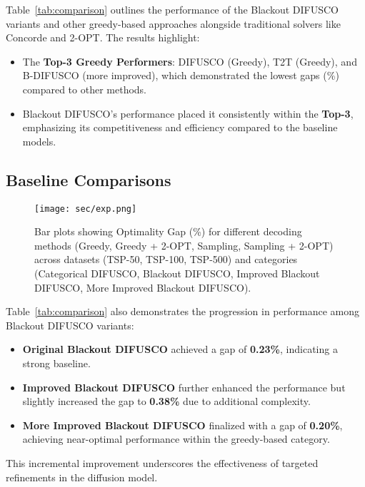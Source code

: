 Table~\ref{tab:comparison} outlines the performance of the Blackout DIFUSCO variants and other greedy-based approaches alongside traditional solvers like Concorde and 2-OPT. The results highlight:
\begin{itemize}
    \item The \textbf{Top-3 Greedy Performers}: DIFUSCO (Greedy), T2T (Greedy), and B-DIFUSCO (more improved), which demonstrated the lowest gaps (\%) compared to other methods.
    \item Blackout DIFUSCO's performance placed it consistently within the \textbf{Top-3}, emphasizing its competitiveness and efficiency compared to the baseline models.
\end{itemize}

\subsection{Baseline Comparisons}

\begin{figure}[ht]
    \centering
    \texttt{[image: sec/exp.png]}
    \caption{Bar plots showing Optimality Gap (\%) for different decoding methods (Greedy, Greedy + 2-OPT, Sampling, Sampling + 2-OPT) across datasets (TSP-50, TSP-100, TSP-500) and categories (Categorical DIFUSCO, Blackout DIFUSCO, Improved Blackout DIFUSCO, More Improved Blackout DIFUSCO).}
    \label{fig:optimality_gap}
\end{figure}

Table~\ref{tab:comparison} also demonstrates the progression in performance among Blackout DIFUSCO variants:
\begin{itemize}
    \item \textbf{Original Blackout DIFUSCO} achieved a gap of \textbf{0.23\%}, indicating a strong baseline.
    \item \textbf{Improved Blackout DIFUSCO} further enhanced the performance but slightly increased the gap to \textbf{0.38\%} due to additional complexity.
    \item \textbf{More Improved Blackout DIFUSCO} finalized with a gap of \textbf{0.20\%}, achieving near-optimal performance within the greedy-based category.
\end{itemize}
This incremental improvement underscores the effectiveness of targeted refinements in the diffusion model.

